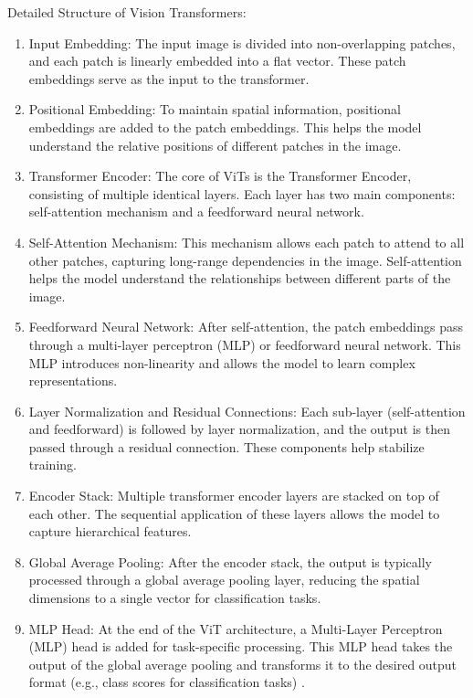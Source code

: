 Detailed Structure of Vision Transformers:
\begin{enumerate}
  \item {Input Embedding: The input image is divided into non-overlapping patches, and each patch is linearly embedded into a flat vector. These patch embeddings serve as the input to the transformer.}
  \item {Positional Embedding: To maintain spatial information, positional embeddings are added to the patch embeddings. This helps the model understand the relative positions of different patches in the image.}
  \item {Transformer Encoder: The core of ViTs is the Transformer Encoder, consisting of multiple identical layers. Each layer has two main components: self-attention mechanism and a feedforward neural network.}
  \item {Self-Attention Mechanism: This mechanism allows each patch to attend to all other patches, capturing long-range dependencies in the image. Self-attention helps the model understand the relationships between different parts of the image.}
  \item {Feedforward Neural Network: After self-attention, the patch embeddings pass through a multi-layer perceptron (MLP) or feedforward neural network. This MLP introduces non-linearity and allows the model to learn complex representations.}
  \item{Layer Normalization and Residual Connections: Each sub-layer (self-attention and feedforward) is followed by layer normalization, and the output is then passed through a residual connection. These components help stabilize training.}
  \item{Encoder Stack: Multiple transformer encoder layers are stacked on top of each other. The sequential application of these layers allows the model to capture hierarchical features.}
  \item{Global Average Pooling: After the encoder stack, the output is typically processed through a global average pooling layer, reducing the spatial dimensions to a single vector for classification tasks.}
  \item{MLP Head: At the end of the ViT architecture, a Multi-Layer Perceptron (MLP) head is added for task-specific processing. This MLP head takes the output of the global average pooling and transforms it to the desired output format (e.g., class scores for classification tasks) \cite{naseer2021intriguing}.}
\end{enumerate}

